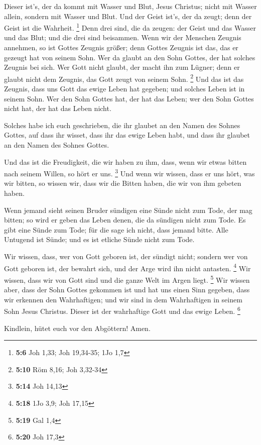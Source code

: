  Dieser ist's, der da kommt mit Wasser und Blut, Jesus
Christus; nicht mit Wasser allein, sondern mit Wasser und Blut. Und der
Geist ist's, der da zeugt; denn der Geist ist die Wahrheit. \footnote{\textbf{5:6}
  Joh 1,33; Joh 19,34-35; 1Jo 1,7}  Denn drei sind, die da
zeugen: der Geist und das Wasser und das Blut;  und die drei
sind beisammen.  Wenn wir der Menschen Zeugnis annehmen, so
ist Gottes Zeugnis größer; denn Gottes Zeugnis ist das, das er gezeugt
hat von seinem Sohn.  Wer da glaubt an den Sohn Gottes, der
hat solches Zeugnis bei sich. Wer Gott nicht glaubt, der macht ihn zum
Lügner; denn er glaubt nicht dem Zeugnis, das Gott zeugt von seinem
Sohn. \footnote{\textbf{5:10} Röm 8,16; Joh 3,32-34}  Und
das ist das Zeugnis, dass uns Gott das ewige Leben hat gegeben; und
solches Leben ist in seinem Sohn.  Wer den Sohn Gottes hat,
der hat das Leben; wer den Sohn Gottes nicht hat, der hat das Leben
nicht.

 Solches habe ich euch geschrieben, die ihr glaubet an den
Namen des Sohnes Gottes, auf dass ihr wisset, dass ihr das ewige Leben
habt, und dass ihr glaubet an den Namen des Sohnes Gottes.

 Und das ist die Freudigkeit, die wir haben zu ihm, dass,
wenn wir etwas bitten nach seinem Willen, so hört er uns. \footnote{\textbf{5:14}
  Joh 14,13}  Und wenn wir wissen, dass er uns hört, was
wir bitten, so wissen wir, dass wir die Bitten haben, die wir von ihm
gebeten haben.

 Wenn jemand sieht seinen Bruder sündigen eine Sünde nicht
zum Tode, der mag bitten; so wird er geben das Leben denen, die da
sündigen nicht zum Tode. Es gibt eine Sünde zum Tode; für die sage ich
nicht, dass jemand bitte.  Alle Untugend ist Sünde; und es
ist etliche Sünde nicht zum Tode.

 Wir wissen, dass, wer von Gott geboren ist, der sündigt
nicht; sondern wer von Gott geboren ist, der bewahrt sich, und der Arge
wird ihn nicht antasten. \footnote{\textbf{5:18} 1Jo 3,9; Joh 17,15}
 Wir wissen, dass wir von Gott sind und die ganze Welt im
Argen liegt. \footnote{\textbf{5:19} Gal 1,4}  Wir wissen
aber, dass der Sohn Gottes gekommen ist und hat uns einen Sinn gegeben,
dass wir erkennen den Wahrhaftigen; und wir sind in dem Wahrhaftigen in
seinem Sohn Jesus Christus. Dieser ist der wahrhaftige Gott und das
ewige Leben. \footnote{\textbf{5:20} Joh 17,3}

 Kindlein, hütet euch vor den Abgöttern! Amen.
